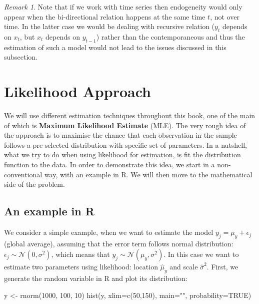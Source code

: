 \documentclass[
]{book}
\newenvironment{Shaded}{\begin{snugshade}}{\end{snugshade}}
\newcommand{\AttributeTok}[1]{\textcolor[rgb]{0.77,0.63,0.00}{#1}}
\newcommand{\ConstantTok}[1]{\textcolor[rgb]{0.00,0.00,0.00}{#1}}
\newcommand{\DecValTok}[1]{\textcolor[rgb]{0.00,0.00,0.81}{#1}}
\newcommand{\FunctionTok}[1]{\textcolor[rgb]{0.00,0.00,0.00}{#1}}
\newcommand{\NormalTok}[1]{#1}
\newcommand{\OtherTok}[1]{\textcolor[rgb]{0.56,0.35,0.01}{#1}}
\newcommand{\StringTok}[1]{\textcolor[rgb]{0.31,0.60,0.02}{#1}}
\theoremstyle{definition}
\theoremstyle{definition}
\theoremstyle{definition}
\theoremstyle{definition}
\theoremstyle{remark}
\newtheorem*{remark}{Remark}
\begin{document}
\begin{remark}
Note that if we work with time series then endogeneity would only appear when the bi-directional relation happens at the same time \(t\), not over time. In the latter case we would be dealing with recursive relation (\(y_t\) depends on \(x_{t}\), but \(x_t\) depends on \(y_{t-1}\)) rather than the contemporaneous and thus the estimation of such a model would not lead to the issues discussed in this subsection.
\end{remark}

\hypertarget{likelihoodApproach}{%
\chapter{Likelihood Approach}\label{likelihoodApproach}}

We will use different estimation techniques throughout this book, one of the main of which is \textbf{Maximum Likelihood Estimate} (MLE). The very rough idea of the approach is to maximise the chance that each observation in the sample follows a pre-selected distribution with specific set of parameters. In a nutshell, what we try to do when using likelihood for estimation, is fit the distribution function to the data. In order to demonstrate this idea, we start in a non-conventional way, with an example in R. We will then move to the mathematical side of the problem.

\hypertarget{likelihoodInR}{%
\section{An example in R}\label{likelihoodInR}}

We consider a simple example, when we want to estimate the model \(y_j = \mu_y + \epsilon_j\) (global average), assuming that the error term follows normal distribution: \(\epsilon_j \sim \mathcal{N}(0, \sigma^2)\), which means that \(y_j \sim \mathcal{N}(\mu_{y}, \sigma^2)\). In this case we want to estimate two parameters using likelihood: location \(\hat{\mu}_y\) and scale \(\hat{\sigma}^2\). First, we generate the random variable in R and plot its distribution:

\begin{Shaded}
\begin{Highlighting}[]
\NormalTok{y }\OtherTok{\textless{}{-}} \FunctionTok{rnorm}\NormalTok{(}\DecValTok{1000}\NormalTok{, }\DecValTok{100}\NormalTok{, }\DecValTok{10}\NormalTok{)}
\FunctionTok{hist}\NormalTok{(y, }\AttributeTok{xlim=}\FunctionTok{c}\NormalTok{(}\DecValTok{50}\NormalTok{,}\DecValTok{150}\NormalTok{), }\AttributeTok{main=}\StringTok{""}\NormalTok{, }\AttributeTok{probability=}\ConstantTok{TRUE}\NormalTok{)}
\end{Highlighting}
\end{Shaded}
\end{document}

